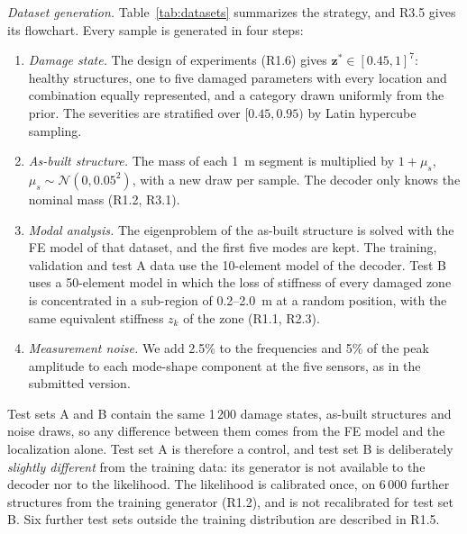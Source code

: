 \documentclass[11pt]{article}
\newcommand{\z}{\mathbf{z}}
\begin{document}
{\color{resp}\textit{Dataset generation.} Table~\ref{tab:datasets} summarizes the strategy, and R3.5 gives its flowchart. Every sample is
generated in four steps:
\begin{enumerate}[leftmargin=*,label=(\arabic*)]
\item \emph{Damage state.} The design of experiments (R1.6) gives $\z^*\in[0.45,1]^7$: healthy structures, one to five damaged
parameters with every location and combination equally represented, and a category drawn uniformly from the prior. The
severities are stratified over $[0.45,0.95)$ by Latin hypercube sampling.
\item \emph{As-built structure.} The mass of each 1~m segment is multiplied by $1+\mu_s$, $\mu_s\sim\mathcal{N}(0,0.05^2)$, with
a new draw per sample. The decoder only knows the nominal mass (R1.2, R3.1).
\item \emph{Modal analysis.} The eigenproblem of the as-built structure is solved with the FE model of that dataset, and the first
five modes are kept. The training, validation and test A data use the 10-element model of the decoder. Test B uses a 50-element
model in which the loss of stiffness of every damaged zone is concentrated in a sub-region of 0.2--2.0~m at a random position,
with the same equivalent stiffness $z_k$ of the zone (R1.1, R2.3).
\item \emph{Measurement noise.} We add 2.5\% to the frequencies and 5\% of the peak amplitude to each mode-shape component at the five
sensors, as in the submitted version.
\end{enumerate}
Test sets A and B contain the same 1\,200 damage states, as-built structures and noise draws, so any difference between them comes
from the FE model and the localization alone. Test set A is therefore a control, and test set B is deliberately \emph{slightly different}
from the training data: its generator is not available to the decoder nor to the likelihood. The likelihood is calibrated once,
on 6\,000 further structures from the training generator (R1.2), and is not recalibrated for test set B. Six further test sets
outside the training distribution are described in R1.5.\par}
\end{document}
